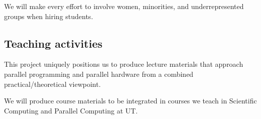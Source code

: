 We will make every effort to involve women, minorities, and underrepresented groups
when hiring students.

\subsection{Teaching activities}

This project uniquely positions us to produce lecture materials that
approach parallel programming and parallel hardware
from a combined practical/theoretical
viewpoint.

We will produce course materials to be integrated in courses we
  teach in Scientific Computing and Parallel Computing at UT.

\endinput

There is a general perception that parallelism is insufficiently
emphasized in education.  This means that students can learn about an
application area without learning how to parallelize its algorithms;
when they become researchers they are apt to produce code that will
have parallelism as an afterthought and probably suboptimally.  Of
course, this situations is not helped by the fact that there is no one
preferred way of expressing parallelism.

Our work will go some way towards improving this situation. 
The \ac{IMP} model is a natural expression for parallel algorithms
that exposes the relevant aspects of data handling,
so it will be a natural medium for teaching the essentials of parallelism
to people who have no other exposure to parallelism.

